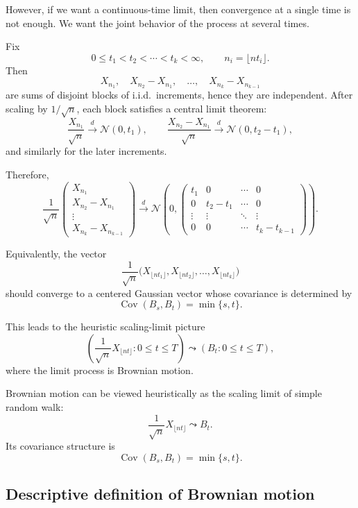 \documentclass[11pt]{article}
\theoremstyle{definition}
\begin{document}
However, if we want a continuous-time limit, then convergence at a single time is not enough. We want the joint behavior of the process at several times.

Fix
\[
0\le t_1<t_2<\cdots<t_k<\infty,
\qquad
n_i=\lfloor nt_i\rfloor.
\]
Then
\[
X_{n_1},\quad X_{n_2}-X_{n_1},\quad \dots,\quad X_{n_k}-X_{n_{k-1}}
\]
are sums of disjoint blocks of i.i.d.\ increments, hence they are independent. After scaling by \(1/\sqrt n\), each block satisfies a central limit theorem:
\[
\frac{X_{n_1}}{\sqrt n}\xrightarrow{d}\mathcal N(0,t_1),
\qquad
\frac{X_{n_2}-X_{n_1}}{\sqrt n}\xrightarrow{d}\mathcal N(0,t_2-t_1),
\]
and similarly for the later increments.

Therefore,
\[
\frac{1}{\sqrt n}
\begin{pmatrix}
X_{n_1}\\
X_{n_2}-X_{n_1}\\
\vdots\\
X_{n_k}-X_{n_{k-1}}
\end{pmatrix}
\xrightarrow{d}
\mathcal N\!\left(
0,
\begin{pmatrix}
t_1 & 0 & \cdots & 0\\
0 & t_2-t_1 & \cdots & 0\\
\vdots & \vdots & \ddots & \vdots\\
0 & 0 & \cdots & t_k-t_{k-1}
\end{pmatrix}
\right).
\]

Equivalently, the vector
\[
\frac{1}{\sqrt n}
\bigl(X_{\lfloor nt_1\rfloor},X_{\lfloor nt_2\rfloor},\dots,X_{\lfloor nt_k\rfloor}\bigr)
\]
should converge to a centered Gaussian vector whose covariance is determined by
\[
\operatorname{Cov}(B_s,B_t)=\min\{s,t\}.
\]

This leads to the heuristic scaling-limit picture
\[
\left(\frac{1}{\sqrt n}X_{\lfloor nt\rfloor}:0\le t\le T\right)
\leadsto
(B_t:0\le t\le T),
\]
where the limit process is Brownian motion.

\begin{keyformula}
Brownian motion can be viewed heuristically as the scaling limit of simple random walk:
\[
\frac{1}{\sqrt n}X_{\lfloor nt\rfloor}\leadsto B_t.
\]
Its covariance structure is
\[
\operatorname{Cov}(B_s,B_t)=\min\{s,t\}.
\]
\end{keyformula}

\subsection{Descriptive definition of Brownian motion}
\end{document}
